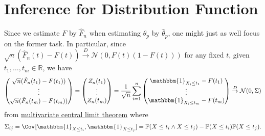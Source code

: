 \section{Inference for Distribution Function}
Since we estimate \(F\) by \(\hat{F} _n\) when estimating \(\theta _p\) by \(\hat{\theta} _p\), one might just as well focus on the former task. In particular, since \(\sqrt{n} (\hat{F} _n(t) - F(t)) \overset{D}{\to} \mathcal{N} (0, F(t) (1 - F(t)))\) for any fixed \(t\), given \(t_1, \dots , t_m \in \mathbb{R} \), we have
\[
	\begin{pmatrix}
		\sqrt{n} (\hat{F} _n(t_1) - F(t_1)) \\
		\vdots                              \\
		\sqrt{n} (\hat{F} _n(t_m) - F(t_m)) \\
	\end{pmatrix}
	= \begin{pmatrix}
		Z_n(t_1) \\
		\vdots   \\
		Z_n(t_m) \\
	\end{pmatrix}
	= \frac{1}{\sqrt{n} } \sum_{i=1}^{n} \begin{pmatrix}
		\mathbbm{1}_{X_i \leq t_1} - F(t_1) \\
		\vdots                              \\
		\mathbbm{1}_{X_i \leq t_m} - F(t_m) \\
	\end{pmatrix}
	\overset{D}{\to} \mathcal{N} (0, \Sigma )
\]
from \hyperref[thm:multivariate-CLT]{multivariate central limit theorem} where
\[
	\Sigma _{ij} = \Cov_{}[\mathbbm{1}_{X \leq t_i} , \mathbbm{1}_{X \leq t_j} ] = \mathbb{P} (X \leq t_i \land X \leq t_j) - \mathbb{P} (X \leq t_i) \mathbb{P} (X \leq t_j).
\]